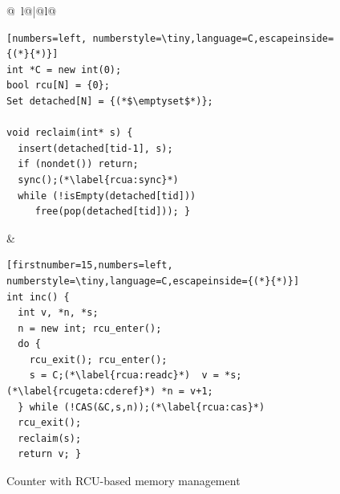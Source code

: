 %
\begin{figure}[t]
\begin{center}
\begin{tabular}{@{\ }l@{\qquad\quad}|@{\qquad\qquad}l@{}}
{\figfontsize
\begin{lstlisting}[numbers=left, numberstyle=\tiny,language=C,escapeinside={(*}{*)}]
int *C = new int(0);
bool rcu[N] = {0};
Set detached[N] = {(*$\emptyset$*)};

void reclaim(int* s) {  
  insert(detached[tid-1], s);
  if (nondet()) return;
  sync();(*\label{rcua:sync}*)
  while (!isEmpty(detached[tid]))
     free(pop(detached[tid])); }
\end{lstlisting}}
&
{\figfontsize
\begin{lstlisting}[firstnumber=15,numbers=left, numberstyle=\tiny,language=C,escapeinside={(*}{*)}]
int inc() {
  int v, *n, *s;
  n = new int; rcu_enter();
  do {
    rcu_exit(); rcu_enter();
    s = C;(*\label{rcua:readc}*)  v = *s;(*\label{rcugeta:cderef}*) *n = v+1;
  } while (!CAS(&C,s,n));(*\label{rcua:cas}*)
  rcu_exit();
  reclaim(s);
  return v; }
\end{lstlisting}
}
\end{tabular}
\end{center}
\vspace{-5pt}
\caption{\label{fig:RCUCounter}
\small  Counter with RCU-based memory management}
\end{figure}

